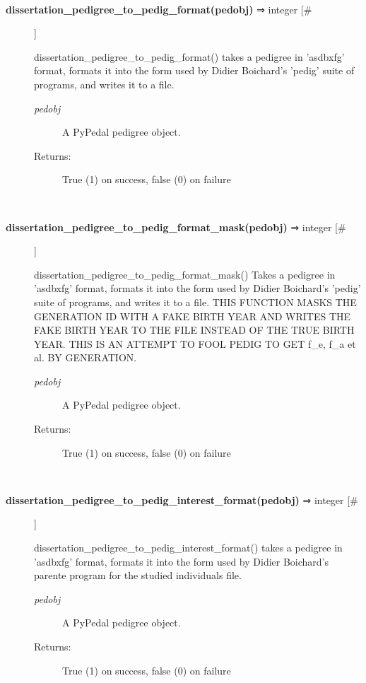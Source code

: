 \begin{description}
\begin{description}
\end{description}
\\ 

\item[\textbf{dissertation\_pedigree\_to\_pedig\_format(pedobj)}
 ⇒ integer [\#]]

 dissertation\_pedigree\_to\_pedig\_format() takes a pedigree in 'asdbxfg' format, formats it into the form used by Didier Boichard's 'pedig' suite of programs, and writes it to a file.
\begin{description}
\item[\emph{pedobj}
] A PyPedal pedigree object.
\item[Returns:] True (1) on success, false (0) on failure

\end{description}
\\ 

\item[\textbf{dissertation\_pedigree\_to\_pedig\_format\_mask(pedobj)}
 ⇒ integer [\#]]

 dissertation\_pedigree\_to\_pedig\_format\_mask() Takes a pedigree in 'asdbxfg' format, formats it into the form used by Didier Boichard's 'pedig' suite of programs, and writes it to a file. THIS FUNCTION MASKS THE GENERATION ID WITH A FAKE BIRTH YEAR AND WRITES THE FAKE BIRTH YEAR TO THE FILE INSTEAD OF THE TRUE BIRTH YEAR. THIS IS AN ATTEMPT TO FOOL PEDIG TO GET f\_e, f\_a et al. BY GENERATION.
\begin{description}
\item[\emph{pedobj}
] A PyPedal pedigree object.
\item[Returns:] True (1) on success, false (0) on failure

\end{description}
\\ 

\item[\textbf{dissertation\_pedigree\_to\_pedig\_interest\_format(pedobj)}
 ⇒ integer [\#]]

 dissertation\_pedigree\_to\_pedig\_interest\_format() takes a pedigree in 'asdbxfg' format, formats it into the form used by Didier Boichard's parente program for the studied individuals file.
\begin{description}
\item[\emph{pedobj}
] A PyPedal pedigree object.
\item[Returns:] True (1) on success, false (0) on failure

\end{description}
\\ 


\end{description}
